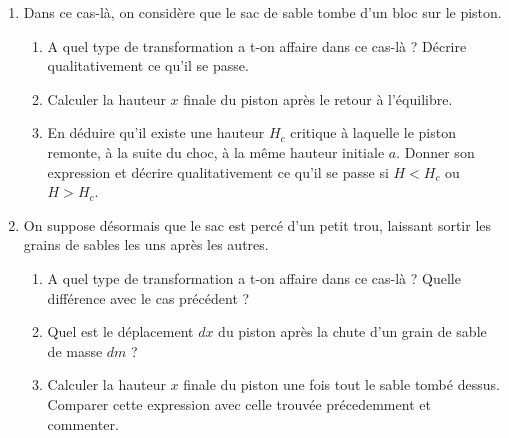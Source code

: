 \begin{enumerate}

\item Dans ce cas-là, on considère que le sac de sable tombe d'un bloc sur le piston.

\begin{enumerate}

\item A quel type de transformation a t-on affaire dans ce cas-là ? Décrire qualitativement ce qu'il se passe.

\item Calculer la hauteur $x$ finale du piston après le retour à l'équilibre.

\item En déduire qu'il existe une hauteur $H_c$ critique à laquelle le piston remonte, à la suite du choc, à la même hauteur initiale $a$. Donner son expression et décrire qualitativement ce qu'il se passe si $H<H_c$ ou $H>H_c$.

\end{enumerate}

\item On suppose désormais que le sac est percé d'un petit trou, laissant sortir les grains de sables les uns après les autres.

\begin{enumerate}

\item A quel type de transformation a t-on affaire dans ce cas-là ? Quelle différence avec le cas précédent ?

\item Quel est le déplacement $dx$ du piston après la chute d'un grain de sable de masse $dm$ ?

\item Calculer la hauteur $x$ finale du piston une fois tout le sable tombé dessus. Comparer cette expression avec celle trouvée précedemment et commenter.

\end{enumerate}

\end{enumerate}

\newpage

